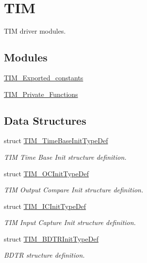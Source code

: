 \hypertarget{group___t_i_m}{\section{T\-I\-M}
\label{group___t_i_m}
}


T\-I\-M driver modules.  


\subsection*{Modules}
\begin{DoxyCompactItemize}
\item 
\hyperlink{group___t_i_m___exported__constants}{T\-I\-M\-\_\-\-Exported\-\_\-constants}
\item 
\hyperlink{group___t_i_m___private___functions}{T\-I\-M\-\_\-\-Private\-\_\-\-Functions}
\end{DoxyCompactItemize}
\subsection*{Data Structures}
\begin{DoxyCompactItemize}
\item 
struct \hyperlink{struct_t_i_m___time_base_init_type_def}{T\-I\-M\-\_\-\-Time\-Base\-Init\-Type\-Def}
\begin{DoxyCompactList}\small\item\em T\-I\-M Time Base Init structure definition. \end{DoxyCompactList}\item 
struct \hyperlink{struct_t_i_m___o_c_init_type_def}{T\-I\-M\-\_\-\-O\-C\-Init\-Type\-Def}
\begin{DoxyCompactList}\small\item\em T\-I\-M Output Compare Init structure definition. \end{DoxyCompactList}\item 
struct \hyperlink{struct_t_i_m___i_c_init_type_def}{T\-I\-M\-\_\-\-I\-C\-Init\-Type\-Def}
\begin{DoxyCompactList}\small\item\em T\-I\-M Input Capture Init structure definition. \end{DoxyCompactList}\item 
struct \hyperlink{struct_t_i_m___b_d_t_r_init_type_def}{T\-I\-M\-\_\-\-B\-D\-T\-R\-Init\-Type\-Def}
\begin{DoxyCompactList}\small\item\em B\-D\-T\-R structure definition. \end{DoxyCompactList}\end{DoxyCompactItemize}
